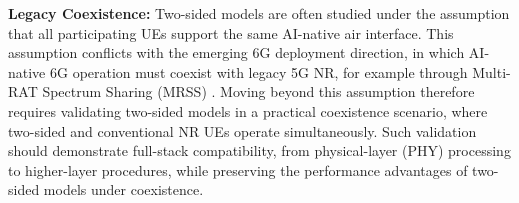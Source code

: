 \documentclass[10pt,twocolumn]{IEEEtran}
\begin{document}



\vspace{1mm}
{\bf Legacy Coexistence:} 
Two-sided models are often studied under the assumption that all participating UEs support the same AI-native air interface. 
This assumption conflicts with the emerging 6G deployment direction, in which AI-native 6G operation must coexist with legacy 5G NR, for example through Multi-RAT Spectrum Sharing (MRSS) \cite{ngmn2026architecture}. Moving beyond this assumption therefore requires validating two-sided models in a practical coexistence scenario, where two-sided and conventional NR UEs operate simultaneously. Such validation should demonstrate full-stack compatibility, from physical-layer (PHY) processing to higher-layer procedures, while preserving the performance advantages of two-sided models under coexistence.

\end{document}
